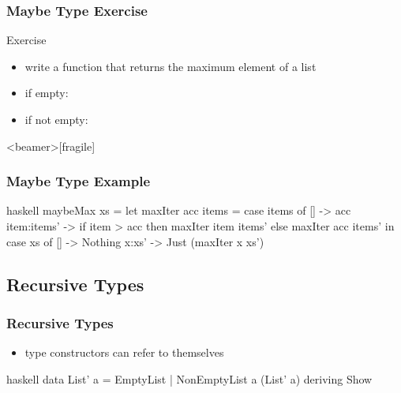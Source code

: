 \documentclass[dvipsnames]{beamer}
\theoremstyle{plain}
\begin{document}
\begin{frame}
  \frametitle{Maybe Type Exercise}

  \begin{block}{Exercise}
    \begin{itemize}
      \item write a function that returns the maximum element of a list
      \item if empty: 
      \item if not empty: 
    \end{itemize}
  \end{block}
\end{frame}

\begin{frame}<beamer>[fragile]
  \frametitle{Maybe Type Example}

  \begin{example}
    \begin{pygments}{haskell}
maybeMax xs =
    let
       maxIter acc items =
           case items of
             [] -> acc
             item:items' -> if item > acc
                            then maxIter item items'
                            else maxIter acc items'
    in
        case xs of
          [] -> Nothing
          x:xs' -> Just (maxIter x xs')
    \end{pygments}
  \end{example}
\end{frame}

\subsection{Recursive Types}

\begin{frame}[fragile]
  \frametitle{Recursive Types}

  \begin{itemize}
    \item type constructors can refer to themselves
  \end{itemize}

  \pause
  \begin{example}[Haskell]
    \begin{pygments}{haskell}
data List' a = EmptyList | NonEmptyList a (List' a)
               deriving Show
    \end{pygments}
  \end{example}
\end{frame}
\end{document}
